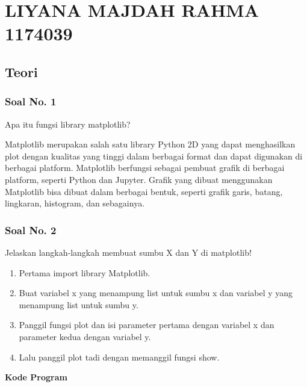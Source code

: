 \section{LIYANA MAJDAH RAHMA 1174039}
\subsection{Teori}
\subsubsection{Soal No. 1}
\hfill \break
Apa itu fungsi library matplotlib?

\hfill \break
Matplotlib merupakan salah satu library Python 2D yang dapat menghasilkan plot dengan kualitas yang tinggi dalam berbagai format dan dapat digunakan di berbagai platform. Matplotlib berfungsi sebagai pembuat grafik di berbagai platform, seperti Python dan Jupyter. Grafik yang dibuat menggunakan Matplotlib bisa dibuat dalam berbagai bentuk, seperti grafik garis, batang, lingkaran, histogram, dan sebagainya.

\subsubsection{Soal No. 2}
\hfill \break
Jelaskan langkah-langkah membuat sumbu X dan Y di matplotlib!

\begin{enumerate}
	\item Pertama import library Matplotlib.	
	
	
	\item Buat variabel x yang menampung list untuk sumbu x dan variabel y yang menampung list untuk sumbu y.	
	
	
	\item Panggil fungsi plot dan isi parameter pertama dengan variabel x dan parameter kedua dengan variabel y.
		

	\item Lalu panggil plot tadi dengan memanggil fungsi show.
	
	
\end{enumerate}
\hfill \break
\textbf{Kode Program}




